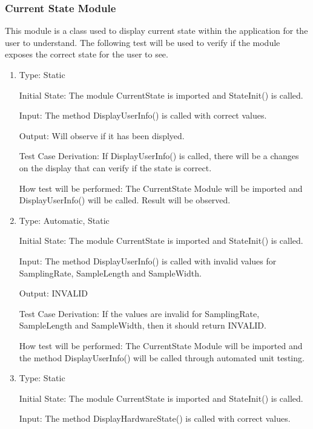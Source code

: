 \documentclass[12pt, titlepage]{article}
\begin{document}
\subsubsection{Current State Module}

This module is a class used to display current state within the application for the user to understand.
The following test will be used to verify if the module exposes the correct state for the user to see.

\begin{enumerate}[{UT-CS}1.]

\item

Type: Static
          
Initial State: The module CurrentState is imported and StateInit() is called.
          
Input: The method DisplayUserInfo() is called with correct values.
          
Output: Will observe if it has been displyed.

Test Case Derivation: If DisplayUserInfo() is called, there will be a changes on the display that can verify if the state is correct.


How test will be performed: The CurrentState Module will be imported and DisplayUserInfo() will be called. Result will be observed.

\item

Type: Automatic, Static
					
Initial State: The module CurrentState is imported and StateInit() is called.
					
Input: The method DisplayUserInfo() is called with invalid values for SamplingRate, SampleLength and SampleWidth.
					
Output: INVALID

Test Case Derivation: If the values are invalid for SamplingRate, SampleLength and SampleWidth, then it should return INVALID.

How test will be performed: The CurrentState Module will be imported and the method DisplayUserInfo() will be called through automated unit testing.

\item

Type: Static
          
Initial State: The module CurrentState is imported and StateInit() is called.
          
Input: The method DisplayHardwareState() is called with correct values.
          

\end{enumerate}
\end{document}
